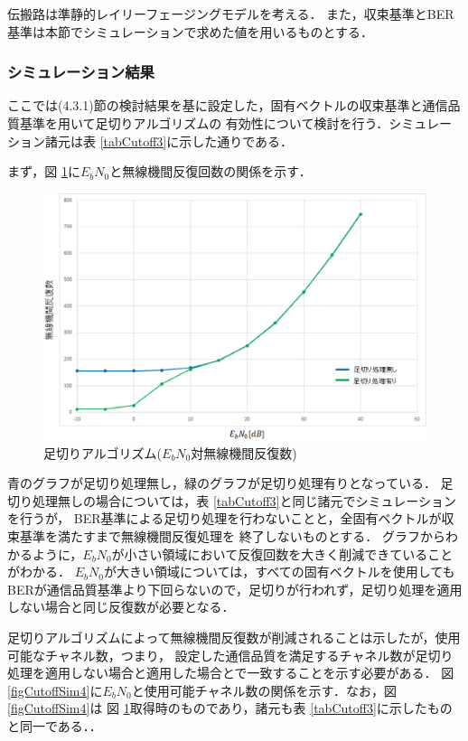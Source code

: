 伝搬路は準静的レイリーフェージングモデルを考える．
また，収束基準とBER基準は本節でシミュレーションで求めた値を用いるものとする．

\subsubsection{シミュレーション結果}
ここでは(4.3.1)節の検討結果を基に設定した，固有ベクトルの収束基準と通信品質基準を用いて足切りアルゴリズムの
有効性について検討を行う．シミュレーション諸元は表 \ref{tabCutoff3}に示した通りである．

まず，図 \ref{figCutoffSim3}に$E_bN_0$と無線機間反復回数の関係を示す．

\begin{figure}[t]
    \centering
    \includegraphics[width=0.95\linewidth]{chapter4/figure/CutoffSim3.eps}
    \caption{足切りアルゴリズム($E_bN_0$対無線機間反復数)}
    \label{figCutoffSim3}
\end{figure}

青のグラフが足切り処理無し，緑のグラフが足切り処理有りとなっている．
足切り処理無しの場合については，表 \ref{tabCutoff3}と同じ諸元でシミュレーションを行うが，
BER基準による足切り処理を行わないことと，全固有ベクトルが収束基準を満たすまで無線機間反復処理を
終了しないものとする．
グラフからわかるように，$E_bN_0$が小さい領域において反復回数を大きく削減できていることがわかる．
$E_bN_0$が大きい領域については，すべての固有ベクトルを使用しても
BERが通信品質基準より下回らないので，足切りが行われず，足切り処理を適用しない場合と同じ反復数が必要となる．

足切りアルゴリズムによって無線機間反復数が削減されることは示したが，使用可能なチャネル数，つまり，
設定した通信品質を満足するチャネル数が足切り処理を適用しない場合と適用した場合とで一致することを示す必要がある．
図 \ref{figCutoffSim4}に$E_bN_0$と使用可能チャネル数の関係を示す．なお，図 \ref{figCutoffSim4}は
図 \ref{figCutoffSim3}取得時のものであり，諸元も表 \ref{tabCutoff3}に示したものと同一である．．

